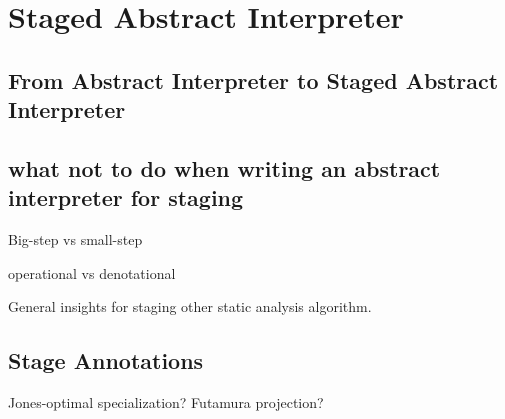 \section{Staged Abstract Interpreter}

\subsection{From Abstract Interpreter to Staged Abstract Interpreter}

\subsection{what not to do when writing an abstract interpreter for staging}

Big-step vs small-step

operational vs denotational

General insights for staging other static analysis algorithm.

\subsection{Stage Annotations}

Jones-optimal specialization?
Futamura projection?
